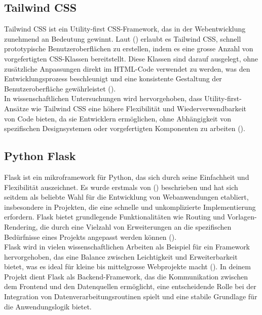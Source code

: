 \documentclass[a4paper, 12pt]{scrartcl}
\begin{document}
\subsection{Tailwind CSS}
Tailwind CSS ist ein Utility-first CSS-Framework, das in der Webentwicklung zunehmend an Bedeutung gewinnt. Laut (\cite[S.119]{Dibia2023}) erlaubt es Tailwind CSS, schnell prototypische Benutzeroberflächen zu erstellen, indem es eine grosse Anzahl von vorgefertigten CSS-Klassen bereitstellt. Diese Klassen sind darauf ausgelegt, ohne zusätzliche Anpassungen direkt im HTML-Code verwendet zu werden, was den Entwicklungsprozess beschleunigt und eine konsistente Gestaltung der Benutzeroberfläche gewährleistet (\cite[S.119]{Dibia2023}).\\[1em] In wissenschaftlichen Untersuchungen wird hervorgehoben, dass Utility-first-Ansätze wie Tailwind CSS eine höhere Flexibilität und Wiederverwendbarkeit von Code bieten, da sie Entwicklern ermöglichen, ohne Abhängigkeit von spezifischen Designsystemen oder vorgefertigten Komponenten zu arbeiten (\cite[S.119]{Dibia2023}).

\subsection{Python Flask}
Flask ist ein mikroframework für Python, das sich durch seine Einfachheit und Flexibilität auszeichnet. Es wurde erstmals von (\cite[S.119]{Dibia2023}) beschrieben und hat sich seitdem als beliebte Wahl für die Entwicklung von Webanwendungen etabliert, insbesondere in Projekten, die eine schnelle und unkomplizierte Implementierung erfordern. Flask bietet grundlegende Funktionalitäten wie Routing und Vorlagen-Rendering, die durch eine Vielzahl von Erweiterungen an die spezifischen Bedürfnisse eines Projekts angepasst werden können (\cite[S.119]{Dibia2023}).\\[1em]Flask wird in vielen wissenschaftlichen Arbeiten als Beispiel für ein Framework hervorgehoben, das eine Balance zwischen Leichtigkeit und Erweiterbarkeit bietet, was es ideal für kleine bis mittelgrosse Webprojekte macht (\cite[S.119]{Dibia2023}). In deinem Projekt dient Flask als Backend-Framework, das die Kommunikation zwischen dem Frontend und den Datenquellen ermöglicht, eine entscheidende Rolle bei der Integration von Datenverarbeitungsroutinen spielt und eine stabile Grundlage für die Anwendungslogik bietet.
\end{document}
